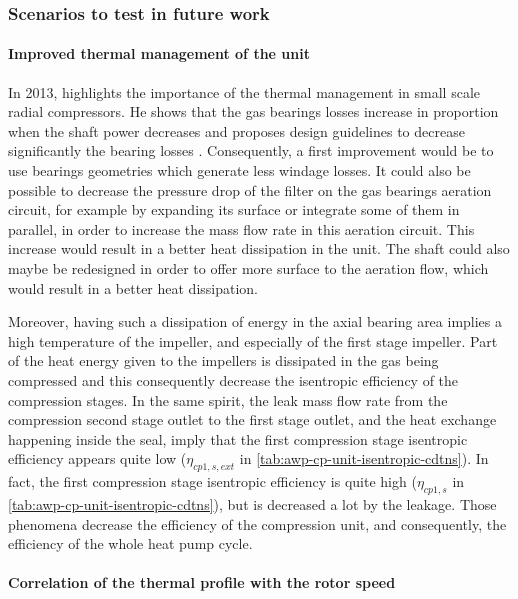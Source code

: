\subsubsection{Scenarios to test in future work}
\label{sec:awp-laby-seal-hot-gas-next}

\paragraph{Improved thermal management of the unit}

In 2013, \citet[p.\,1--2]{schiffmann-2013a} highlights the importance
of the thermal management in small scale radial compressors. He shows
that the gas bearings losses increase in proportion when the shaft
power decreases \citep[p.\,1 \& fig.\,1 p.\,2]{schiffmann-2013a} and
proposes design guidelines to decrease significantly the bearing
losses \citep[tab. 4 p.\,6]{schiffmann-2013a}. Consequently, a first
improvement would be to use bearings geometries which generate less
windage losses. It could also be possible to decrease the pressure
drop of the filter on the gas bearings aeration circuit, for example
by expanding its surface or integrate some of them in parallel, in order
to increase the mass flow rate in this aeration circuit. This increase
would result in a better heat dissipation in the unit. The shaft could
also maybe be redesigned in order to offer more surface to the aeration
flow, which would result in a better heat dissipation.

Moreover, having such a dissipation of energy in the axial bearing
area implies a high temperature of the impeller, and especially of the
first stage impeller. Part of the heat energy given to the impellers
is dissipated in the gas being compressed and this consequently
decrease the isentropic efficiency of the compression stages. In the
same spirit, the leak mass flow rate from the compression second stage
outlet to the first stage outlet, and the heat exchange happening
inside the seal, imply that the first compression stage isentropic
efficiency appears quite low ($\eta_{cp1,s,ext}$ in
\cref{tab:awp-cp-unit-isentropic-cdtns}). In fact, the first
compression stage isentropic efficiency is quite high ($\eta_{cp1,s}$
in \cref{tab:awp-cp-unit-isentropic-cdtns}), but is decreased a lot by
the leakage. Those phenomena decrease the efficiency of the
compression unit, and consequently, the efficiency of the whole heat
pump cycle.

\paragraph{Correlation of the thermal profile with the rotor speed}

